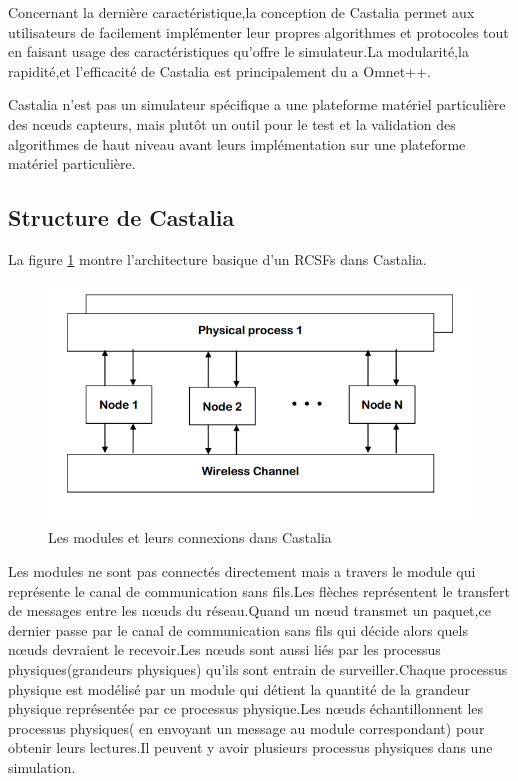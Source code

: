Concernant la dernière caractéristique,la conception de Castalia permet aux utilisateurs de facilement implémenter leur propres algorithmes et protocoles tout en faisant usage des caractéristiques qu'offre le simulateur.La modularité,la rapidité,et l'efficacité de Castalia est principalement du a Omnet++.

Castalia n'est pas un simulateur spécifique a une plateforme matériel particulière des nœuds capteurs, mais plutôt un outil pour le test et la validation des algorithmes de haut niveau avant leurs implémentation sur une plateforme matériel particulière.
\subsection{Structure de Castalia}
La figure \ref{basicStructCastalia} montre l'architecture basique d'un RCSFs dans Castalia.
\begin{figure}[!h]
\includegraphics[scale=0.7]{basicStructCastalia}
\caption{\label{basicStructCastalia} Les modules et leurs connexions dans Castalia}
\end{figure}

Les modules ne sont pas connectés directement mais a travers le module qui représente le canal de communication sans fils.Les flèches représentent le transfert de messages entre les nœuds du réseau.Quand un nœud transmet un paquet,ce dernier passe par le canal de communication sans fils qui décide alors quels nœuds devraient le recevoir.Les nœuds sont aussi liés par les processus physiques(grandeurs physiques) qu'ils sont entrain de surveiller.Chaque processus physique est modélisé par un module qui détient la quantité de la grandeur physique représentée par ce processus physique.Les nœuds échantillonnent les processus physiques( en envoyant un message au module correspondant) pour obtenir leurs lectures.Il peuvent y avoir plusieurs processus physiques dans une simulation.

